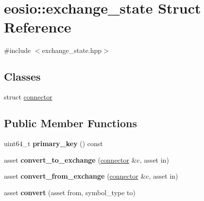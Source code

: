 \hypertarget{structeosio_1_1exchange__state}{}\section{eosio\+:\+:exchange\+\_\+state Struct Reference}
\label{structeosio_1_1exchange__state}


{\ttfamily \#include $<$exchange\+\_\+state.\+hpp$>$}

\subsection*{Classes}
\begin{DoxyCompactItemize}
\item 
struct \mbox{\hyperlink{structeosio_1_1exchange__state_1_1connector}{connector}}
\end{DoxyCompactItemize}
\subsection*{Public Member Functions}
\begin{DoxyCompactItemize}
\item 
\mbox{\label{structeosio_1_1exchange__state_a962eb5ae2f354cf80058dc8243b3885c}} 
uint64\+\_\+t {\bfseries primary\+\_\+key} () const
\item 
\mbox{\label{structeosio_1_1exchange__state_aa08cbbecf8ca4e38d8cf1a5def73698a}} 
asset {\bfseries convert\+\_\+to\+\_\+exchange} (\mbox{\hyperlink{structeosio_1_1exchange__state_1_1connector}{connector}} \&c, asset in)
\item 
\mbox{\label{structeosio_1_1exchange__state_a77fd99f9208e6c53266e31d1ede65f72}} 
asset {\bfseries convert\+\_\+from\+\_\+exchange} (\mbox{\hyperlink{structeosio_1_1exchange__state_1_1connector}{connector}} \&c, asset in)
\item 
\mbox{\label{structeosio_1_1exchange__state_aa7780b69911868e7b0262d3c93627f7a}} 
asset {\bfseries convert} (asset from, symbol\+\_\+type to)
\end{DoxyCompactItemize}
